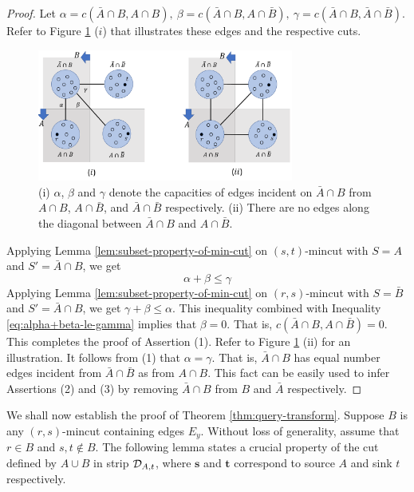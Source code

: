 \begin{proof}
Let $\alpha = c(\bar{A}\cap B, A\cap {B}),
~\beta = c(\bar{A} \cap B, A\cap \bar{B}),~\gamma=c(\bar{A} \cap B, \bar{A}\cap \bar{B})$.
Refer to Figure \ref{fig:non-S-crossing} ($i$) that illustrates these edges and the respective cuts.
\begin{figure}[H]
\centering
\includegraphics[width=0.75\textwidth]{src/images/S-crossing-and-non-crossing_new.pdf}
    \caption{(i) $\alpha$, $\beta$ and $\gamma$ denote the capacities of edges incident on $\bar{A}\cap B$ from $A\cap B$, $A\cap \bar{B}$, and $\bar{A} \cap \bar{B}$ respectively. (ii) There are no edges along the diagonal between $\bar{A}\cap {B}$ and $A\cap \bar{B}$.}
\label{fig:non-S-crossing}
\end{figure}

Applying Lemma \ref{lem:subset-property-of-min-cut}
on $(s,t)$-mincut with $S=A$ and $S'= \bar{A}\cap B$, we get
\begin{equation}
    \alpha + \beta \le \gamma 
\label{eq:alpha+beta-le-gamma}
\end{equation}
Applying Lemma \ref{lem:subset-property-of-min-cut} on $(r,s)$-mincut with $S=\bar B$ and  $S'= \bar{A} \cap B$, we get $\gamma + \beta \le \alpha$. This inequality combined with Inequality \ref{eq:alpha+beta-le-gamma} implies that $\beta=0$. That is, $c(\bar{A}\cap B, A\cap \bar{B})=0$. This completes the proof of Assertion (1). Refer to Figure \ref{fig:non-S-crossing} (ii) for an illustration. 
It follows from (1) that $\alpha=\gamma$.
That is, $\bar{A} \cap B$ has equal number edges incident from $\bar{A}\cap \bar{B}$ as from $A\cap B$.  This fact can be easily used to infer Assertions (2) and (3) by 
removing $\bar{A}\cap B$ from $B$ and
$\bar{A}$ respectively.
\end{proof}

We shall now establish the proof of Theorem \ref{thm:query-transform}. Suppose $B$ is any $(r,s)$-mincut containing edges $E_y$. Without loss of generality, assume that $r\in B$ and $s,t\notin B$. The following lemma states a crucial property of the cut defined by $A\cup B$ in strip ${\cal D}_{A,t}$, where $\mathbf{s}$ and $\mathbf{t}$ correspond to source $A$ and sink $t$ respectively.

